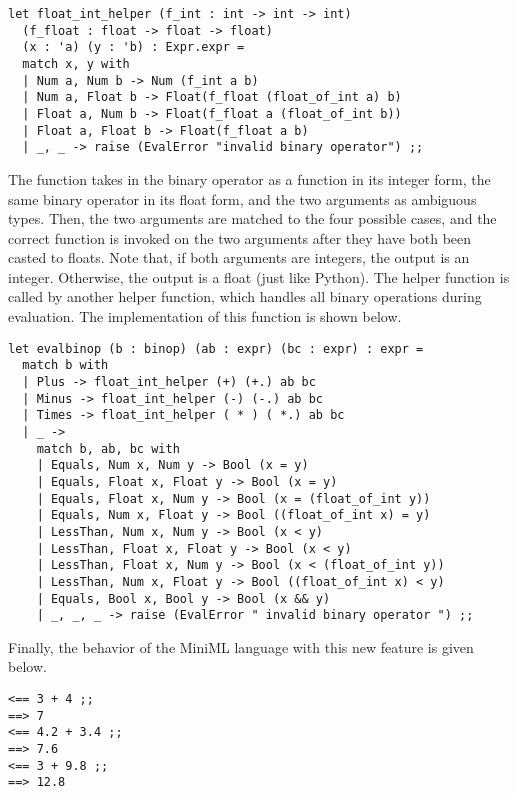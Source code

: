 \documentclass{article}
\begin{document}
\begin{verbatim}
let float_int_helper (f_int : int -> int -> int) 
  (f_float : float -> float -> float) 
  (x : 'a) (y : 'b) : Expr.expr =
  match x, y with
  | Num a, Num b -> Num (f_int a b)
  | Num a, Float b -> Float(f_float (float_of_int a) b)
  | Float a, Num b -> Float(f_float a (float_of_int b))
  | Float a, Float b -> Float(f_float a b)
  | _, _ -> raise (EvalError "invalid binary operator") ;;
\end{verbatim}

The function takes in the binary operator as a function in its integer form, the same binary operator in its float form, and the two arguments as ambiguous types. Then, the two arguments are matched to the four possible cases, and the correct function is invoked on the two arguments after they have both been casted to floats. Note that, if both arguments are integers, the output is an integer. Otherwise, the output is a float (just like Python). The helper function is called by another helper function, which handles all binary operations during evaluation. The implementation of this function is shown below. 

\begin{verbatim}
let evalbinop (b : binop) (ab : expr) (bc : expr) : expr =
  match b with
  | Plus -> float_int_helper (+) (+.) ab bc
  | Minus -> float_int_helper (-) (-.) ab bc
  | Times -> float_int_helper ( * ) ( *.) ab bc
  | _ -> 
    match b, ab, bc with
    | Equals, Num x, Num y -> Bool (x = y)
    | Equals, Float x, Float y -> Bool (x = y)
    | Equals, Float x, Num y -> Bool (x = (float_of_int y))
    | Equals, Num x, Float y -> Bool ((float_of_int x) = y)
    | LessThan, Num x, Num y -> Bool (x < y)
    | LessThan, Float x, Float y -> Bool (x < y)
    | LessThan, Float x, Num y -> Bool (x < (float_of_int y))
    | LessThan, Num x, Float y -> Bool ((float_of_int x) < y)
    | Equals, Bool x, Bool y -> Bool (x && y)
    | _, _, _ -> raise (EvalError " invalid binary operator ") ;;
\end{verbatim}

Finally, the behavior of the MiniML language with this new feature is given below.

\begin{verbatim}
<== 3 + 4 ;;
==> 7
<== 4.2 + 3.4 ;;
==> 7.6
<== 3 + 9.8 ;;
==> 12.8
\end{verbatim}
\end{document}
